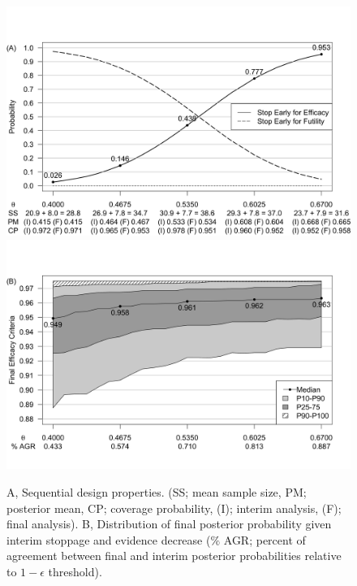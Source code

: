\documentclass[AMA,STIX1COL,doublespace]{WileyNJD-v2}
\begin{document}
\begin{figure}
\begin{center}

    \includegraphics[width=6in]{figure3a.png}
    \includegraphics[width=6in]{figure3b.png}
    \caption{A, Sequential design properties. (SS; mean sample size, PM; posterior mean, CP; coverage probability, (I); interim analysis, (F); final analysis). B, Distribution of final posterior probability given interim stoppage and evidence decrease ($\%$ AGR; percent of agreement between final and interim posterior probabilities relative to $1-\epsilon$ threshold).}
	\label{fig:ex1.1}

\end{center}
\end{figure}
\end{document}
